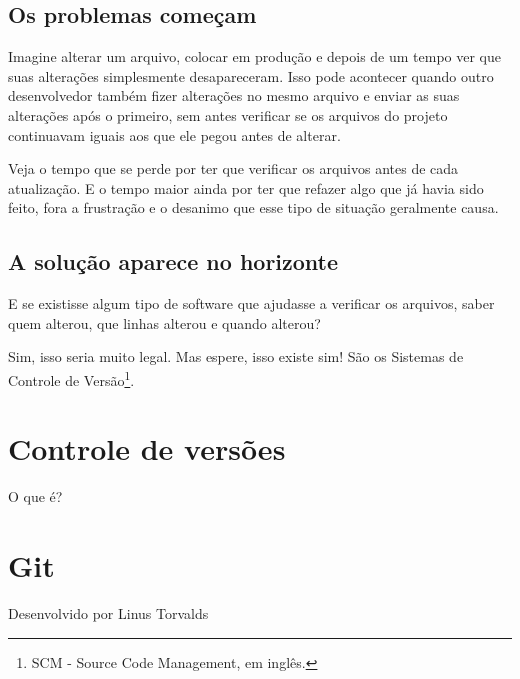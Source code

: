 \documentclass[12pt,a4paper]{report}
\begin{document}
    \section{Os problemas começam}
        Imagine alterar um arquivo, colocar em produção e depois de um tempo ver
        que suas alterações simplesmente desapareceram. Isso pode acontecer quando
        outro desenvolvedor também fizer alterações no mesmo arquivo e enviar as
        suas alterações após o primeiro, sem antes verificar se os arquivos do
        projeto continuavam iguais aos que ele pegou antes de alterar.
        
        Veja o tempo que se perde por ter que verificar os arquivos antes de
        cada atualização. E o tempo maior ainda por ter que refazer algo que já
        havia sido feito, fora a frustração e o desanimo que esse tipo de
        situação geralmente causa.
    
    \section{A solução aparece no horizonte}
        E se existisse algum tipo de software que ajudasse a verificar os
        arquivos, saber quem alterou, que linhas alterou e quando alterou?
        
        Sim, isso seria muito legal. Mas espere, isso existe sim! São os
        Sistemas de Controle de Versão\footnote{SCM - Source Code Management,
        em inglês.}.

\chapter{Controle de versões}
    O que é?

\chapter{Git}
    Desenvolvido por Linus Torvalds
\end{document}
